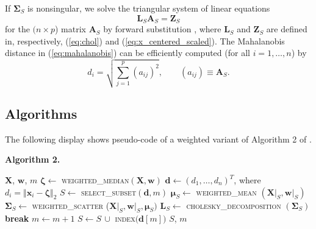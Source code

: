 \documentclass[a4paper,oneside,11pt,DIV=12]{scrartcl}
\newcommand{\code}[1]{{\texttt{#1}}}
\begin{document}
\noindent If $\bm \Sigma_S$ is nonsingular, we solve the triangular system
of linear equations
\begin{equation}\label{eq:inverse_chol}
	\bm L_S \bm  A_S= \bm Z_S
\end{equation}
\noindent for the $(n \times p$) matrix $\bm A_S$ by forward
substitution \citep[\code{BLAS}: \code{dtrsm},][]{blackford_petitet_etal_2002},
where $\bm L_S$ and $\bm Z_S$ are defined in, respectively,
(\ref{eq:chol}) and  (\ref{eq:x_centered_scaled}). The Mahalanobis
distance in (\ref{eq:mahalanobis}) can be efficiently computed
(for all $i=1,\ldots, n$) by
\begin{equation}\label{eq:maha_chol}
	d_i = \sqrt{\sum_{j=1}^p (a_{ij})^2}, \qquad (a_{ij}) \equiv \bm A_S.
\end{equation}

\subsection{Algorithms}
The following display shows pseudo-code of a weighted variant of
Algorithm 2 of \citet{billor_hadi_etal_2000}.

\vspace{1em}
\noindent \textbf{\sffamily Algorithm 2.}
\begin{algorithmic}[1]\label{}
	\hypertarget{alg:alg2}{\Require $\bm X$, $\bm w$, $m$}
	\State $\bm \zeta \gets$ \textsc{weighted\_median}$(\bm X, \bm w)$
	\State $\bm d \gets (d_1, \ldots, d_n)^T$, where
		$d_i = \Vert \bm x_i - \bm \zeta \Vert_2$
	\State $S \gets$ \textsc{select\_subset}$(\bm d, m)$
		\State $\bm \mu_S \gets$ \textsc{weighted\_mean}
			$(\bm X\vert_S, \bm w\vert_S)$
		\State $\bm \Sigma_S \gets$ \textsc{weighted\_scatter}
			($\bm X\vert_S, \bm w\vert_S, \bm \mu_S)$
			\State $\bm L_S \gets$ \textsc{cholesky\_decomposition}
				$(\bm \Sigma_S)$
				\State \textbf{break}
			\EndIf
		\EndIf
			\State $m \gets m + 1$
			\State $S \gets S \, \cup$ \textsc{index}$\big(\bm d[m]\big)$
	\EndWhile
	\State \Return $S$, $m$
\end{algorithmic}
\end{document}

